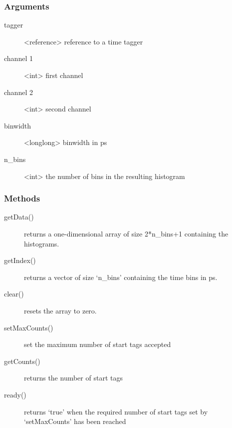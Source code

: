 \documentclass[letterpaper,10pt,english]{sphinxmanual}
\begin{document}
\subsubsection{Arguments}
\label{sections/api:arguments}\begin{description}
\item[{tagger}] \leavevmode
\textless{}reference\textgreater{} reference to a time tagger

\item[{channel 1}] \leavevmode
\textless{}int\textgreater{} first channel

\item[{channel 2}] \leavevmode
\textless{}int\textgreater{} second channel

\item[{binwidth}] \leavevmode
\textless{}longlong\textgreater{} binwidth in ps

\item[{n\_bins}] \leavevmode
\textless{}int\textgreater{} the number of bins in the resulting histogram

\end{description}


\subsubsection{Methods}
\label{sections/api:id1}\begin{description}
\item[{getData()}] \leavevmode
returns a one-dimensional array of size 2*n\_bins+1 containing the histograms.

\item[{getIndex()}] \leavevmode
returns a vector of size `n\_bins' containing the time bins in ps.

\item[{clear()}] \leavevmode
resets the array to zero.

\item[{setMaxCounts()}] \leavevmode
set the maximum number of start tags accepted

\item[{getCounts()}] \leavevmode
returns the number of start tags

\item[{ready()}] \leavevmode
returns `true' when the required number of start tags set by `setMaxCounts' has been reached

\end{description}
\end{document}
